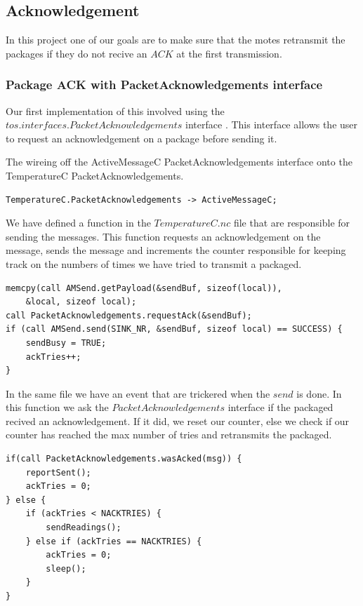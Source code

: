 \subsection{Acknowledgement}
In this project one of our goals are to make sure that the motes retransmit the
packages if they do not recive an $ACK$ at the first transmission.

\subsubsection{Package ACK with PacketAcknowledgements interface}

Our first implementation of this involved using the
$tos.interfaces.PacketAcknowledgements$ interface \cite{telosbAPI}. This
interface allows the user to request an acknowledgement on a package before
sending it.

The wireing off the ActiveMessageC PacketAcknowledgements interface onto the
TemperatureC PacketAcknowledgements.

\begin{lstlisting}[caption={TemperatureAppC.nc}]
 TemperatureC.PacketAcknowledgements -> ActiveMessageC;
\end{lstlisting}

We have defined a function in the $TemperatureC.nc$ file that are responsible
for sending the messages. This function requests an acknowledgement on the
message, sends the message and increments the counter responsible for keeping
track on the numbers of times we have tried to transmit a packaged.

\begin{lstlisting}[caption={TemperatureC.nc $\rightarrow$ sendReadings()}]
memcpy(call AMSend.getPayload(&sendBuf, sizeof(local)),
    &local, sizeof local);
call PacketAcknowledgements.requestAck(&sendBuf);
if (call AMSend.send(SINK_NR, &sendBuf, sizeof local) == SUCCESS) {
    sendBusy = TRUE;
    ackTries++;
}
\end{lstlisting}

In the same file we have an event that are trickered when the $send$ is done.
In this function we ask the $PacketAcknowledgements$ interface if the packaged
recived an acknowledgement. If it did, we reset our counter, else we check if
our counter has reached the max number of tries and retransmits the packaged.

\begin{lstlisting}[caption={TemperatureC.nc $\rightarrow$ AMSend.sendDone()}]
if(call PacketAcknowledgements.wasAcked(msg)) {
    reportSent();
    ackTries = 0;
} else {
    if (ackTries < NACKTRIES) {
        sendReadings();
    } else if (ackTries == NACKTRIES) {
        ackTries = 0;
        sleep();
    }
}
\end{lstlisting}

